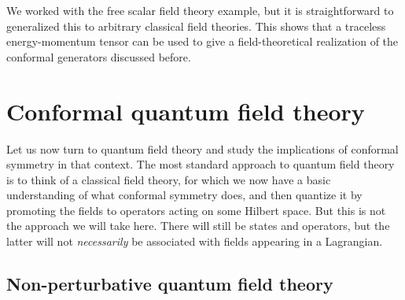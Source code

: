 \documentclass[a4paper,12pt]{article}
\numberwithin{equation}{section}
\newcounter{exercise}[section]
\begin{document}
We worked with the free scalar field theory example, but it is straightforward to generalized this to arbitrary classical field theories. This shows that a traceless energy-momentum tensor can be used to give a field-theoretical realization of the conformal generators discussed before.



\section{Conformal quantum field theory}
\label{sec:quantum}

Let us now turn to quantum field theory and study the implications of conformal symmetry in that context. The most standard approach to quantum field theory is to think of a classical field theory, for which we now have a basic understanding of what conformal symmetry does, and then quantize it by promoting the fields to operators acting on some Hilbert space.
But this is not the approach we will take here. There will still be states and operators, but the latter will not \emph{necessarily} be associated with fields appearing in a Lagrangian.

\subsection{Non-perturbative quantum field theory}
\end{document}
